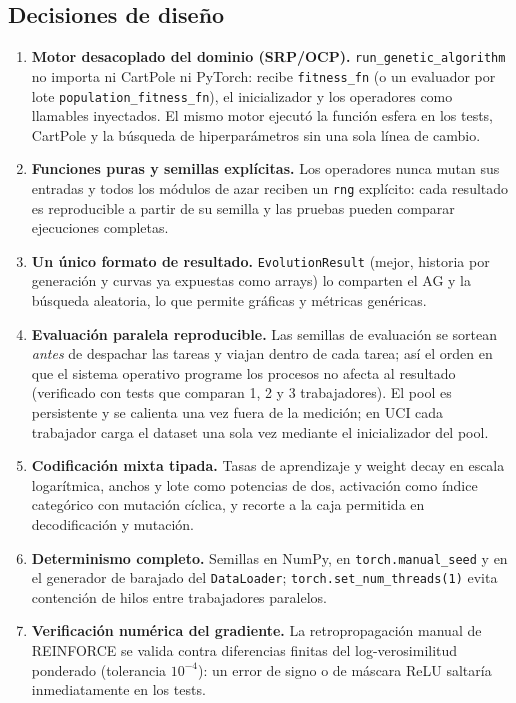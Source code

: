 \subsection{Decisiones de diseño}

{\small
\begin{enumerate}
  \item \textbf{Motor desacoplado del dominio (SRP/OCP).} \texttt{run\_genetic\_algorithm} no importa ni CartPole ni PyTorch: recibe \texttt{fitness\_fn} (o un evaluador por lote \texttt{population\_fitness\_fn}), el inicializador y los operadores como llamables inyectados. El mismo motor ejecutó la función esfera en los tests, CartPole y la búsqueda de hiperparámetros sin una sola línea de cambio.
  \item \textbf{Funciones puras y semillas explícitas.} Los operadores nunca mutan sus entradas y todos los módulos de azar reciben un \texttt{rng} explícito: cada resultado es reproducible a partir de su semilla y las pruebas pueden comparar ejecuciones completas.
  \item \textbf{Un único formato de resultado.} \texttt{EvolutionResult} (mejor, historia por generación y curvas ya expuestas como arrays) lo comparten el AG y la búsqueda aleatoria, lo que permite gráficas y métricas genéricas.
  \item \textbf{Evaluación paralela reproducible.} Las semillas de evaluación se sortean \emph{antes} de despachar las tareas y viajan dentro de cada tarea; así el orden en que el sistema operativo programe los procesos no afecta al resultado (verificado con tests que comparan 1, 2 y 3 trabajadores). El pool es persistente y se calienta una vez fuera de la medición; en UCI cada trabajador carga el dataset una sola vez mediante el inicializador del pool.
  \item \textbf{Codificación mixta tipada.} Tasas de aprendizaje y weight decay en escala logarítmica, anchos y lote como potencias de dos, activación como índice categórico con mutación cíclica, y recorte a la caja permitida en decodificación y mutación.
  \item \textbf{Determinismo completo.} Semillas en NumPy, en \texttt{torch.manual\_seed} y en el generador de barajado del \texttt{DataLoader}; \texttt{torch.set\_num\_threads(1)} evita contención de hilos entre trabajadores paralelos.
  \item \textbf{Verificación numérica del gradiente.} La retropropagación manual de REINFORCE se valida contra diferencias finitas del log-verosimilitud ponderado (tolerancia $10^{-4}$): un error de signo o de máscara ReLU saltaría inmediatamente en los tests.
\end{enumerate}
}

